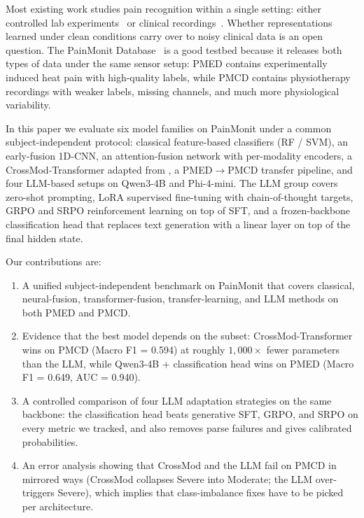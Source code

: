 \documentclass{article}
\begin{document}
Most existing work studies pain recognition within a single setting: either controlled lab experiments~\citep{walter2013biovid,gruss2019multimodal} or clinical recordings~\citep{gouverneur2024painmonit}. Whether representations learned under clean conditions carry over to noisy clinical data is an open question. The PainMonit Database~\citep{gouverneur2024painmonit} is a good testbed because it releases both types of data under the same sensor setup: PMED contains experimentally induced heat pain with high-quality labels, while PMCD contains physiotherapy recordings with weaker labels, missing channels, and much more physiological variability.

In this paper we evaluate six model families on PainMonit under a common subject-independent protocol: classical feature-based classifiers (RF / SVM), an early-fusion 1D-CNN, an attention-fusion network with per-modality encoders, a CrossMod-Transformer adapted from \citet{farmani2025crossmod}, a PMED$\to$PMCD transfer pipeline, and four LLM-based setups on Qwen3-4B and Phi-4-mini. The LLM group covers zero-shot prompting, LoRA supervised fine-tuning with chain-of-thought targets, GRPO and SRPO reinforcement learning on top of SFT, and a frozen-backbone classification head that replaces text generation with a linear layer on top of the final hidden state.

Our contributions are:
\begin{enumerate}[leftmargin=*]
    \item A unified subject-independent benchmark on PainMonit that covers classical, neural-fusion, transformer-fusion, transfer-learning, and LLM methods on both PMED and PMCD.
    \item Evidence that the best model depends on the subset: CrossMod-Transformer wins on PMCD (Macro F1 = 0.594) at roughly $1{,}000\times$ fewer parameters than the LLM, while Qwen3-4B + classification head wins on PMED (Macro F1 = 0.649, AUC = 0.940).
    \item A controlled comparison of four LLM adaptation strategies on the same backbone: the classification head beats generative SFT, GRPO, and SRPO on every metric we tracked, and also removes parse failures and gives calibrated probabilities.
    \item An error analysis showing that CrossMod and the LLM fail on PMCD in mirrored ways (CrossMod collapses Severe into Moderate; the LLM over-triggers Severe), which implies that class-imbalance fixes have to be picked per architecture.
\end{enumerate}
\end{document}
